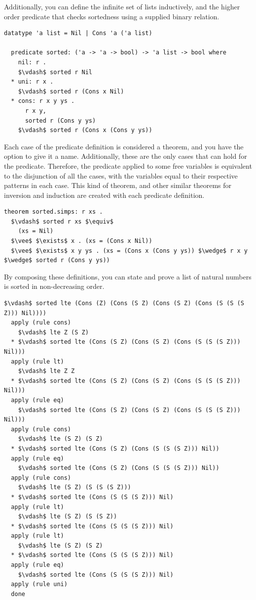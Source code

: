\documentclass[letterpaper, 11pt]{report}
\begin{document}
Additionally, you can define the infinite set of lists inductively, and the higher order predicate that checks
sortedness using a supplied binary relation.

\begin{lstlisting}[language=logic]
  datatype 'a list = Nil | Cons 'a ('a list)
  
  predicate sorted: ('a -> 'a -> bool) -> 'a list -> bool where
    nil: r . 
    $\vdash$ sorted r Nil
  * uni: r x . 
    $\vdash$ sorted r (Cons x Nil)
  * cons: r x y ys .
      r x y,
      sorted r (Cons y ys)
    $\vdash$ sorted r (Cons x (Cons y ys))
\end{lstlisting}

Each case of the predicate definition is considered a theorem, and you have the option to give it a name. 
Additionally, these are the only cases that can hold for the predicate. Therefore, the predicate applied to some free
variables is equivalent to the disjunction of all the cases, with the variables equal to their respective patterns
in each case. This kind of theorem, and other similar theorems for inversion and induction
are created with each predicate definition.

\begin{lstlisting}[language=logic]
  theorem sorted.simps: r xs .
  $\vdash$ sorted r xs $\equiv$
    (xs = Nil)
  $\vee$ $\exists$ x . (xs = (Cons x Nil))
  $\vee$ $\exists$ x y ys . (xs = (Cons x (Cons y ys)) $\wedge$ r x y $\wedge$ sorted r (Cons y ys))
\end{lstlisting}

By composing these definitions, you can state and prove a list of natural numbers is sorted in non-decreasing order.

\begin{lstlisting}[language=logic]
  $\vdash$ sorted lte (Cons (Z) (Cons (S Z) (Cons (S Z) (Cons (S (S (S Z))) Nil))))
  apply (rule cons)
    $\vdash$ lte Z (S Z)
  * $\vdash$ sorted lte (Cons (S Z) (Cons (S Z) (Cons (S (S (S Z))) Nil)))
  apply (rule lt)
    $\vdash$ lte Z Z
  * $\vdash$ sorted lte (Cons (S Z) (Cons (S Z) (Cons (S (S (S Z))) Nil)))
  apply (rule eq)
    $\vdash$ sorted lte (Cons (S Z) (Cons (S Z) (Cons (S (S (S Z))) Nil)))
  apply (rule cons)
    $\vdash$ lte (S Z) (S Z)
  * $\vdash$ sorted lte (Cons (S Z) (Cons (S (S (S Z))) Nil))
  apply (rule eq)
    $\vdash$ sorted lte (Cons (S Z) (Cons (S (S (S Z))) Nil))
  apply (rule cons)
    $\vdash$ lte (S Z) (S (S (S Z)))
  * $\vdash$ sorted lte (Cons (S (S (S Z))) Nil)
  apply (rule lt)
    $\vdash$ lte (S Z) (S (S Z))
  * $\vdash$ sorted lte (Cons (S (S (S Z))) Nil)
  apply (rule lt)
    $\vdash$ lte (S Z) (S Z)
  * $\vdash$ sorted lte (Cons (S (S (S Z))) Nil)
  apply (rule eq)
    $\vdash$ sorted lte (Cons (S (S (S Z))) Nil)
  apply (rule uni)
  done
\end{lstlisting}
\end{document}
